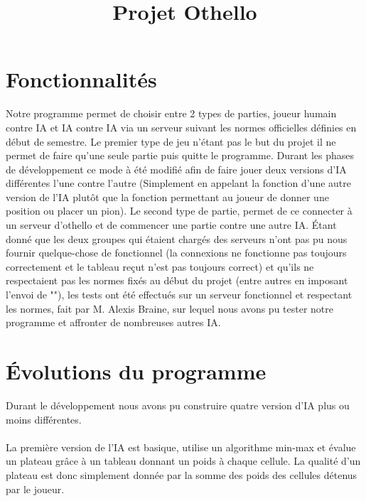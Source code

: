 \documentclass[a4paper,10pt]{article}
\title{Projet Othello}
\author{\bsc{Kevin Hivert} \bsc{Ronan Abhamon}}
\date{}
\begin{document}
\maketitle
\tableofcontents

\section{Fonctionnalités}
\noindent
Notre programme permet de choisir entre 2 types de parties, joueur humain contre IA et IA contre IA via un serveur suivant les normes officielles définies en début de semestre.
Le premier type de jeu n'étant pas le but du projet il ne permet de faire qu'une seule partie puis quitte le programme. Durant les phases de développement ce mode à été modifié afin de faire jouer deux versions d'IA différentes l'une contre l'autre (Simplement en appelant la fonction d'une autre version de l'IA plutôt que la fonction permettant au joueur de donner une position ou placer un pion).
Le second type de partie, permet de ce connecter à un serveur d'othello et de commencer une partie contre une autre IA.
Étant donné que les deux groupes qui étaient chargés des serveurs n'ont pas pu nous fournir quelque-chose de fonctionnel (la connexions ne fonctionne pas toujours correctement et le tableau reçut n'est pas toujours correct) et qu'ils ne respectaient pas les normes fixés au début du projet (entre autres en imposant l'envoi de "\n"), les tests ont été effectués sur un serveur fonctionnel et respectant les normes, fait par M. Alexis Braine, sur lequel nous avons pu tester notre programme et affronter de nombreuses autres IA.

\section{Évolutions du programme}
\noindent
Durant le développement nous avons pu construire quatre version d'IA plus ou moins différentes.

\paragraph{}La première version de l'IA est basique, utilise un algorithme min-max et évalue un plateau grâce à un tableau donnant un poids à chaque cellule. La qualité d'un plateau est donc simplement donnée par la somme des poids des cellules détenus par le joueur.
\end{document}
